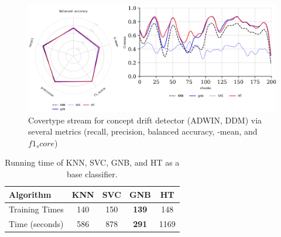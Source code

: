 \begin{figure}[t]
	\centering
	\includegraphics[width=1\linewidth]{5_Emerging/images/res4.png}
	\caption{Covertype stream for concept drift detector (ADWIN, DDM) via several metrics (recall, precision, balanced accuracy, -mean, and $f1_score$)}
	\label{fig:res4}
\end{figure}				

	
\begin{table}[t]
	\centering
	\begin{tabular}{|l|c|c|c|c|}
	\hline
	\textbf{Algorithm}     & \textbf{KNN} & \textbf{SVC} & \textbf{GNB} & \textbf{HT} \\ \hline
		Training Times         & 140          & 150          & \textbf{139} & 148         \\ \hline
		Time (seconds)         & 586          & 878          & \textbf{291} & 1169        \\ \hline
	\end{tabular}
  \caption{Running time of KNN, SVC, GNB, and HT as a base classifier.}
	\label{table:table_3}
	\end{table}


